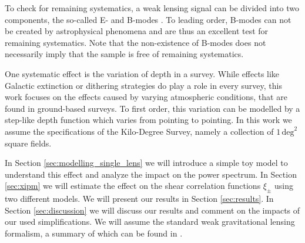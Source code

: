 To check for remaining systematics, a weak lensing signal can be divided into two components, the so-called E- and B-modes \citep{2002ApJ...568...20C,2002A&A...389..729S}. To leading order, B-modes can not be created by astrophysical phenomena and are thus an excellent test for remaining systematics. Note that the non-existence of B-modes does not necessarily imply that the sample is free of remaining systematics.

One systematic effect is the variation of depth in a survey. While effects like Galactic extinction or dithering strategies do play a role in every survey, this work focuses on the effects caused by varying atmospheric conditions, that are found in ground-based surveys. To first order, this variation can be modelled by a step-like depth function which varies from pointing to pointing. In this work we assume the specifications of the Kilo-Degree Survey, namely a collection of $1\,\text{deg}^2$ square fields. 

In Section \ref{sec:modelling_single_lens} we will introduce a simple toy model to understand this effect and analyze the impact on the power spectrum. In Section \ref{sec:xipm} we will estimate the effect on the shear correlation functions $\xi_\pm$ using two different models. We will present our results in Section \ref{sec:results}. In Section \ref{sec:discussion} we will discuss our results and comment on the impacts of our used simplifications. We will assume the standard weak gravitational lensing formalism, a summary of which can be found in \citet{2001PhR...340..291B}.
